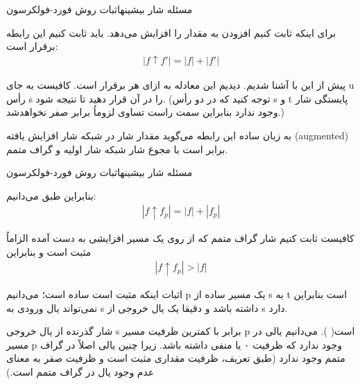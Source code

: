 \begin{itemframe}{مسئله شار بیشینه}{اثبات روش فورد-فولکرسون}

\item
برای اینکه ثابت کنیم افزودن
به
مقدار
را افزایش می‌دهد. باید ثابت کنیم این رابطه برقرار است:
\begin{align}
|f \uparrow f'|=|f| + |f'|
\label{aug-flow-sum}
\end{align}
\item

پیش از این با
آشنا شدیم. دیدیم این معادله به ازای هر
برقرار است. کافیست به جای u رأس s را در آن قرار دهید تا
نتیجه شود. (توجه کنید که در دو رأس s و t پایستگی شار وجود ندارد بنابراین سمت راست تساوی لزوماُ برابر صفر نخواهد‌شد.)
\item
به زبان ساده این رابطه می‌گوید مقدار شار در شبکه شار افزایش یافته (augmented) برابر است با مجوع شار شبکه شار اولیه و گراف متمم.
\end{itemframe}

\begin{itemframe}{مسئله شار بیشینه}{اثبات روش فورد-فولکرسون}
\item
بنابراین طبق
می‌دانیم:
\begin{align*}
|f \uparrow f_p| = |f| + |f_p|
\end{align*}
\item
کافیست ثابت کنیم شار گراف متمم که از روی یک مسیر افزایشی به دست آمده الزاماُ مثبت است و بنابراین
\begin{align*}
|f \uparrow f_p| > |f|
\end{align*}
\item
اثبات اینکه
مثبت است ساده است؛ می‌دانیم p یک مسیر ساده از s به t است بنابراین نمی‌تواند یال ورودی به s داشته باشد و دقیقا یک یال خروجی از s دارد.
\item
شار گذرنده از یال خروجی s برابر با کمترین ظرفیت مسیر p است(
).  می‌دانیم یالی در مسیر p وجود ندارد که ظرفیت ۰ یا منفی داشته باشد. زیرا چنین یالی اصلاً در گراف متمم وجود ندارد (طبق تعریف، ظرفیت مقداری مثبت است و ظرفیت صفر به معنای عدم وجود یال در گراف متمم است.)
\end{itemframe}